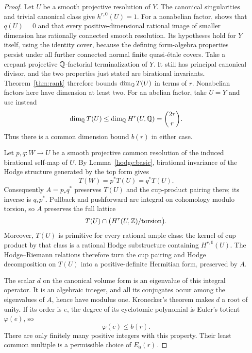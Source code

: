 \begin{proof}
Let $U$ be a smooth projective resolution of $Y$.  The canonical
singularities and trivial canonical class give
$h^{r,0}(U)=1$.  For a nonabelian factor,
\citet[Lemma~5.2]{UPI}
shows that $q(U)=0$ and that every positive-dimensional rational
image of smaller dimension has rationally connected smooth
resolution.  Its hypotheses hold for $Y$ itself, using the identity
cover, because the defining form-algebra properties persist under
all further connected normal finite quasi-\'etale covers.
Take a crepant projective $\mathbb Q$-factorial terminalization of $Y$.
It still has principal canonical divisor, and the two properties
just stated are birational invariants.  Theorem~\ref{thm:rank}
therefore bounds $\dim_{\mathbb Q}T(U)$ in terms of $r$.  Nonabelian
factors here have dimension at least two.  For an abelian factor,
take $U=Y$ and use instead
\[
                  \dim_{\mathbb Q}T(U)\leq\dim_{\mathbb Q}H^r(U,\mathbb Q)
                                      =\binom{2r}{r}.
\]
Thus there is a common dimension bound $b(r)$ in either case.

Let $p,q:W\to U$ be a smooth projective common resolution of the
induced birational self-map of $U$.  By Lemma~\ref{hodge:basic},
birational invariance of the Hodge structure generated by the top
form gives
\[
                     T(W)=p^*T(U)=q^*T(U).
\]
Consequently $A=p_*q^*$ preserves $T(U)$ and the cup-product
pairing there; its inverse is $q_*p^*$.  Pullback and pushforward
are integral on cohomology modulo torsion, so $A$ preserves the full
lattice
\[
        T(U)\cap\bigl(H^r(U,\mathbb Z)/\text{torsion}\bigr).
\]
Moreover, $T(U)$ is primitive for every rational ample class:
the kernel of cup product by that class is a rational Hodge
substructure containing $H^{r,0}(U)$.  The Hodge--Riemann relations
therefore turn the cup pairing and Hodge decomposition on $T(U)$
into a positive-definite Hermitian form, preserved by $A$.

The scalar $d$ on the canonical volume form is an eigenvalue of
this integral operator.  It is an algebraic integer, and all its
conjugates occur among the eigenvalues of $A$, hence have modulus
one.  Kronecker's theorem makes $d$ a root of unity.  If its order
is $e$, the degree of its cyclotomic polynomial is Euler's totient
$\varphi(e)$, so
\[
                         \varphi(e)\leq b(r).
\]
There are only finitely many positive integers with this property.
Their least common multiple is a permissible choice of $E_0(r)$.
\end{proof}

